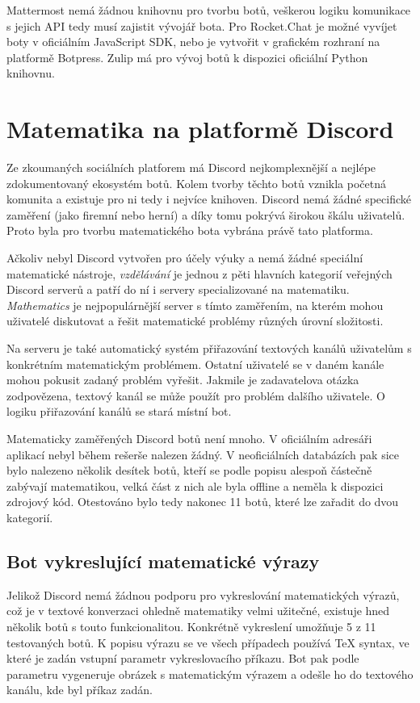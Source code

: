 \documentclass[FM]{tulthesis}
\begin{document}
	Mattermost nemá žádnou knihovnu pro tvorbu botů, veškerou logiku komunikace s jejich API tedy musí zajistit vývojář bota. Pro Rocket.Chat je možné vyvíjet boty v oficiálním JavaScript SDK, nebo je vytvořit v grafickém rozhraní na platformě Botpress. Zulip má pro vývoj botů k dispozici oficiální Python knihovnu.
		
	\chapter{Matematika na platformě Discord}\label{Chapter3}
	
	Ze zkoumaných sociálních platforem má Discord nejkomplexnější a nejlépe zdokumentovaný ekosystém botů. Kolem tvorby těchto botů vznikla početná komunita a existuje pro ni tedy i nejvíce knihoven. Discord nemá žádné specifické zaměření (jako firemní nebo herní) a díky tomu pokrývá širokou škálu uživatelů. Proto byla pro tvorbu matematického bota vybrána právě tato platforma.
	
	Ačkoliv nebyl Discord vytvořen pro účely výuky a nemá žádné speciální matematické nástroje, \textit{vzdělávání} je jednou z pěti hlavních kategorií veřejných Discord serverů a patří do ní i servery specializované na matematiku. \textit{Mathematics} je nejpopulárnější server s tímto zaměřením, na kterém mohou uživatelé diskutovat a řešit matematické problémy různých úrovní složitosti.
	
	Na serveru je také automatický systém přiřazování textových kanálů uživatelům s konkrétním matematickým problémem. Ostatní uživatelé se v daném kanále mohou pokusit zadaný problém vyřešit. Jakmile je zadavatelova otázka zodpovězena, textový kanál se může použít pro problém dalšího uživatele. O logiku přiřazování kanálů se stará místní bot.
	
	Matematicky zaměřených Discord botů není mnoho. V oficiálním adresáři aplikací nebyl během rešerše nalezen žádný. V neoficiálních databázích pak sice bylo nalezeno několik desítek botů, kteří se podle popisu alespoň částečně zabývají matematikou, velká část z nich ale byla offline a neměla k dispozici zdrojový kód. Otestováno bylo tedy nakonec 11 botů, které lze zařadit do dvou kategorií.
	
	\section{Bot vykreslující matematické výrazy}\label{_tag_section_texbot}

	Jelikož Discord nemá žádnou podporu pro vykreslování matematických výrazů, což je v textové konverzaci ohledně matematiky velmi užitečné, existuje hned několik botů s touto funkcionalitou. Konkrétně vykreslení umožňuje 5 z 11 testovaných botů. K popisu výrazu se ve všech případech používá TeX syntax, ve které je zadán vstupní parametr vykreslovacího příkazu. Bot pak podle parametru vygeneruje obrázek s matematickým výrazem a odešle ho do textového kanálu, kde byl příkaz zadán.
	
\end{document}
